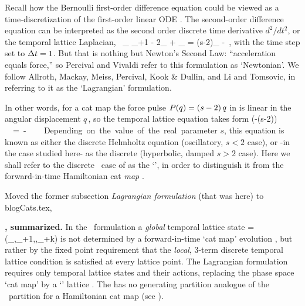 Recall how the Bernoulli first-order difference equation could be viewed as
a time-discretization of the first-order linear ODE . The
second-order difference equation  can be interpreted as the
second order discrete time derivative ${d^2}/{dt^2}$, or the temporal
lattice Laplacian,
\beq
\Box \, \ssp_\zeit \equiv
\ssp_{\zeit+1} - 2\ssp_{\zeit} + \ssp_{}
= (s-2)\ssp_{\zeit} -\Ssym{\zeit}
\,,
 with the time step set to $\Delta t=1$.
But that is nothing but Newton's Second Law: ``acceleration equals
force,'' so Percival and Vivaldi refer to this formulation as
`Newtonian'. We follow Allroth, Mackay, Meiss, Percival,
Kook \& Dullin, and Li and
Tomsovic, in referring to it as the
`Lagrangian' formulation.

In other words, for a cat map the force pulse $P(q)=(s-2)\,q$
in  is linear in the angular displacement $q$, so
the temporal lattice equation takes form
\beq
(\Box -(s-2)\unit)\,\Xx =-\Mm
\,.
Depending on the value of the real parameter $s$, this equation is known
as either the discrete Helmholtz equation (oscillatory, $s<2$ case), or
-in the case studied here- as the discrete {\em \sPe} (hyperbolic, damped
$s>2$ case). Here we shall refer to the discrete
\sPe\ case of  as the `{\em \templatt}', in order to
distinguish it from the forward-in-time Hamiltonian cat \emph{map} .

 {
    Moved the former subsection {\em Lagrangian formulation}
    (that was here) to blogCats.tex,
    }


\bigskip

\noindent\textbf{\tempLatt, summarized.}
In the \spt\ formulation a \emph{global} {temporal lattice state}
\beq
\transp{\Xx} %
             = (\ssp_\zeit,\ssp_{\zeit+1},\cdots,\ssp_{\zeit+k})
is not determined by a forward-in-time `cat map' evolution
, but rather by the fixed point requirement
 that the \emph{local}, 3-term discrete temporal
lattice condition  is satisfied at every lattice
point. The Lagrangian formulation requires only temporal lattice states
and their actions, replacing the phase space `cat map' 
by a `{\templatt}' lattice . The {\templatt} has no
generating partition analogue of the \AW\ partition for a Hamiltonian cat
map (see ).

